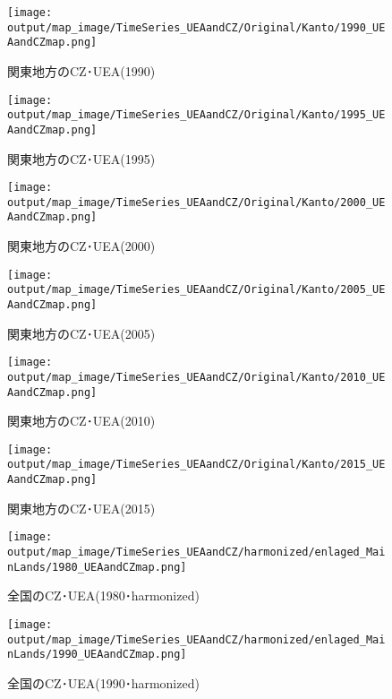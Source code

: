 \documentclass{ltjsarticle}
\begin{document}
\begin{figure}[pbth]
  \centering
  \texttt{[image: output/map\_image/TimeSeries\_UEAandCZ/Original/Kanto/1990\_UEAandCZmap.png]}
  \caption{\label{ori:tsK1990}関東地方のCZ･UEA(1990)}
\end{figure}

\begin{figure}[pbth]
  \centering
  \texttt{[image: output/map\_image/TimeSeries\_UEAandCZ/Original/Kanto/1995\_UEAandCZmap.png]}
  \caption{\label{ori:tsK1995}関東地方のCZ･UEA(1995)}
\end{figure}

\begin{figure}[pbth]
  \centering
  \texttt{[image: output/map\_image/TimeSeries\_UEAandCZ/Original/Kanto/2000\_UEAandCZmap.png]}
  \caption{\label{ori:tsK2000}関東地方のCZ･UEA(2000)}
\end{figure}

\begin{figure}[pbth]
  \centering
  \texttt{[image: output/map\_image/TimeSeries\_UEAandCZ/Original/Kanto/2005\_UEAandCZmap.png]}
  \caption{\label{ori:tsK2005}関東地方のCZ･UEA(2005)}
\end{figure}

\begin{figure}[pbth]
  \centering
  \texttt{[image: output/map\_image/TimeSeries\_UEAandCZ/Original/Kanto/2010\_UEAandCZmap.png]}
  \caption{\label{ori:tsK2010}関東地方のCZ･UEA(2010)}
\end{figure}

\begin{figure}[pbth]
  \centering
  \texttt{[image: output/map\_image/TimeSeries\_UEAandCZ/Original/Kanto/2015\_UEAandCZmap.png]}
  \caption{\label{ori:tsK2015}関東地方のCZ･UEA(2015)}
\end{figure}

  \begin{figure}[pbth]
    \centering
    \texttt{[image: output/map\_image/TimeSeries\_UEAandCZ/harmonized/enlaged\_MainLands/1980\_UEAandCZmap.png]}
    \caption{\label{ham:tsM1980}全国のCZ･UEA(1980･harmonized)}
  \end{figure}
  
  \begin{figure}[pbth]
    \centering
    \texttt{[image: output/map\_image/TimeSeries\_UEAandCZ/harmonized/enlaged\_MainLands/1990\_UEAandCZmap.png]}
    \caption{\label{ham:tsM1990}全国のCZ･UEA(1990･harmonized)}
  \end{figure}
  
\end{document}
